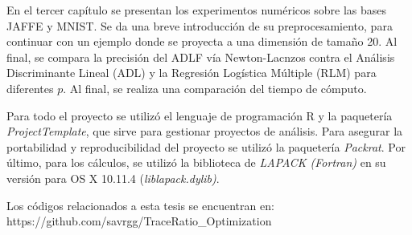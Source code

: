 En el tercer capítulo se presentan los experimentos numéricos sobre las bases JAFFE y MNIST. Se da una breve introducción de su preprocesamiento, para continuar con un ejemplo donde se proyecta a una dimensión de tamaño 20. Al final, se compara la precisión del ADLF vía Newton-Lacnzos contra el Análisis Discriminante Lineal (ADL) y la Regresión Logística Múltiple (RLM) para diferentes $p$. Al final, se realiza una comparación del tiempo de cómputo.

Para todo el proyecto se utilizó el lenguaje de programación R y la paquetería \textit{ProjectTemplate}, que sirve para gestionar proyectos de análisis. Para asegurar la portabilidad y reproducibilidad del proyecto se utilizó la paquetería \textit{Packrat}. Por último, para los cálculos, se utilizó la biblioteca de \textit{LAPACK (Fortran)}  en su versión para OS X 10.11.4 (\textit{liblapack.dylib)}. 

Los códigos relacionados a esta tesis se encuentran en: 	
\\https://github.com/savrgg/TraceRatio\_Optimization



